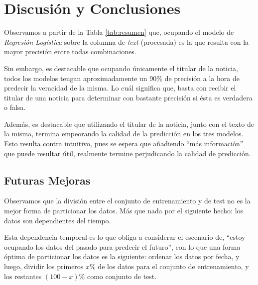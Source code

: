 \section{Discusión y Conclusiones}
{

Observamos a partir de la Tabla \ref{tab:resumen} que, ocupando el modelo de \textit{Regresión Logística} sobre la columna de \textit{text} (procesada) es la que resulta con la mayor precisión entre todas combinaciones. 

Sin embargo, es destacable que ocupando únicamente el titular de la noticia, todos los modelos tengan aproximadamente un $90\%$ de precisión a la hora de predecir la veracidad de la misma. Lo cuál significa que, basta con recibir el titular de una noticia para determinar con bastante precisión si ésta es verdadera o falsa.

Además, es destacable que utilizando el titular de la noticia, junto con el texto de la misma, termina empeorando la calidad de la predicción en los tres modelos. Esto resulta contra intuitivo, pues se espera que añadiendo ``más información'' que puede resultar útil, realmente termine perjudicando la calidad de predicción.

\subsection{Futuras Mejoras}

Observamos que la división entre el conjunto de entrenamiento y de test no es la mejor forma de particionar los datos. Más que nada por el siguiente hecho: los datos son dependientes del tiempo. 

Esta dependencia temporal es lo que obliga a considerar el escenario de, ``estoy ocupando los datos del pasado para predecir el futuro'', con lo que una forma óptima de particionar los datos es la siguiente: ordenar los datos por fecha, y luego, dividir los primeros $x\%$ de los datos para el conjunto de entrenamiento, y los restantes $(100-x)\%$ como conjunto de test.
}


